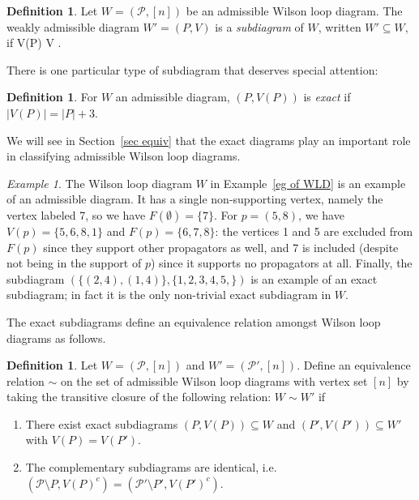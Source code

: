 \documentclass[11pt]{article}
\def\bas #1\eas{\begin{align*} #1 \end{align*}}
\newcommand{\cP}{\mathcal{P}}
\theoremstyle{remark}
\newtheorem{eg}[thm]{Example}
\theoremstyle{definition}
\newtheorem{dfn}[thm]{Definition}
\begin{document}
\begin{dfn} \label{subdiagramdfn}
Let $W = (\cP, [n])$ be an admissible Wilson loop diagram. The weakly admissible diagram $W' = (P,V)$ is a {\em subdiagram} of $W$, written $W' \subseteq W$, if \bas P \subseteq \cP {} \quad V(P) \subseteq V \subseteq [n]\;.\eas
\end{dfn}

There is one particular type of subdiagram that deserves special attention:

\begin{dfn}\label{def:exact diagram}
For $W$ an admissible diagram, $(P, V(P))$ is {\em exact} if $|V(P)| = |P| + 3$.
\end{dfn}

We will see in Section~\ref{sec equiv} that the exact diagrams play an important role in classifying admissible Wilson loop diagrams.

\begin{eg}
The Wilson loop diagram $W$ in Example~\ref{eg of WLD} is an example of an admissible diagram. It has a single non-supporting vertex, namely the vertex labeled 7, so we have $F(\emptyset) = \{7\}$. For $p = (5, 8)$, we have $V(p) = \{5,6,8,1\}$ and $F(p) = \{6, 7,8\}$: the vertices 1 and 5 are excluded from $F(p)$ since they support other propagators as well, and 7 is included (despite not being in the support of $p$) since it supports no propagators at all. Finally, the subdiagram $(\{(2, 4), (1, 4)\}, \{1, 2, 3, 4, 5, \})$ is an example of an exact subdiagram; in fact it is the only non-trivial exact subdiagram in $W$.
\end{eg}

The exact subdiagrams define an equivalence relation amongst Wilson loop diagrams as follows.

\begin{dfn}\label{equivdfn} 
Let $W = (\cP,[n])$ and $W' = (\cP',[n])$. Define an equivalence relation $\sim$ on the set of admissible Wilson loop diagrams with vertex set $[n]$ by taking the transitive closure of the following relation: $W \sim W'$ if
\begin{enumerate}
\item There exist exact subdiagrams $(P, V(P)) \subseteq W$ and $(P', V(P')) \subseteq W'$ with $V(P) =  V(P')$.
\item The complementary subdiagrams are identical, i.e. $(\cP \setminus P, V(P)^c) = (\cP' \setminus P', V(P')^c)$.
\end{enumerate}
\end{dfn}
\end{document}
